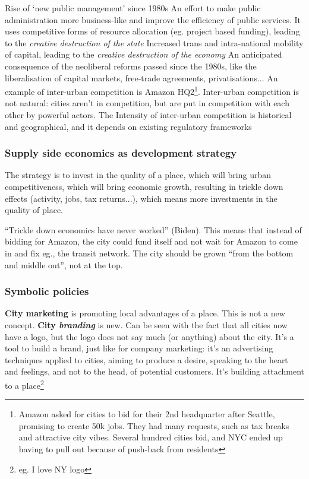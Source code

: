 \documentclass{article}
\begin{document}
\begin{outline}
	\1 Rise of `new public management' since 1980s
		\2 An effort to make public administration more business-like and improve the efficiency of public services. It uses competitive forms of resource allocation (eg. project based funding), leading to the \textit{creative destruction of the state}
	\1 Increased trans and intra-national mobility of capital, leading to the \textit{creative destruction of the economy}
		\2 An anticipated consequence of the neoliberal reforms passed since the 1980s, like the liberalisation of capital markets, free-trade agreements, privatisations...
		\2 An example of inter-urban competition is Amazon HQ2\footnote{Amazon asked for cities to bid for their 2nd headquarter after Seattle, promising to create 50k jobs. They had many requests, such as tax breaks and attractive city vibes. Several hundred cities bid, and NYC ended up having to pull out because of push-back from residents}. Inter-urban competition is not natural: cities aren't in competition, but are put in competition with each other by powerful actors.
		\2 The Intensity of inter-urban competition is historical and geographical, and it depends on existing regulatory frameworks
\end{outline}
	
\subsubsection{Supply side economics as development strategy}

The strategy is to invest in the quality of a place, which will bring urban competitiveness, which will bring economic growth, resulting in trickle down effects (activity, jobs, tax returns...), which means more investments in the quality of place.

``Trickle down economics have never worked'' (Biden). This means that instead of bidding for Amazon, the city could fund itself and not wait for Amazon to come in and fix eg., the transit network. The city should be grown ``from the bottom and middle out'', not at the top.

\subsubsection{Symbolic policies}

\textbf{City marketing} is promoting local advantages of a place. This is not a new concept.
\textbf{City \textit{branding}} is new. Can be seen with the fact that all cities now have a logo, but the logo does not say much (or anything) about the city. It's a tool to build a brand, just like for company marketing: it's an advertising techniques applied to cities, aiming to produce a desire, speaking to the heart and feelings, and not to the head, of potential customers. It's building attachment to a place\footnote{eg. I love NY logo} 
\end{document}
